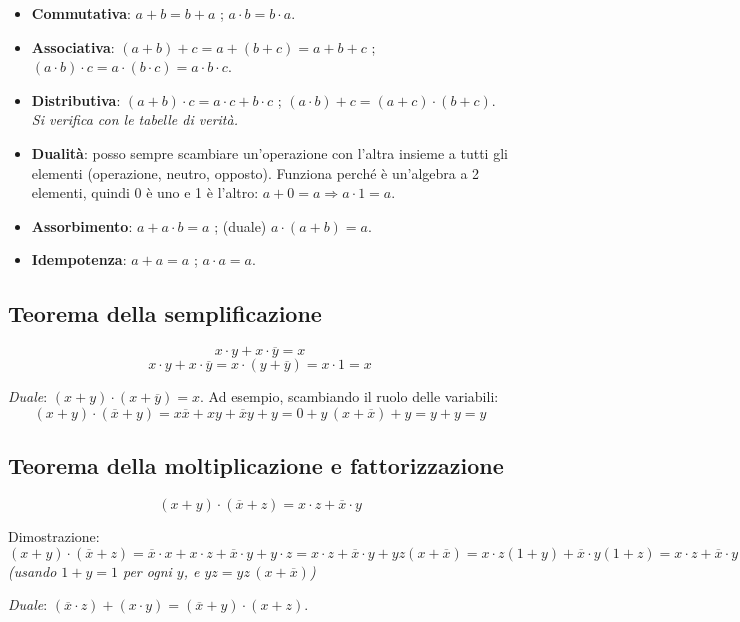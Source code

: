 \begin{itemize}[leftmargin=1.5em]
    \item \textbf{Commutativa}: $a+b=b+a$ \quad ; \quad $a\cdot b=b\cdot a$.
    \item \textbf{Associativa}: $(a+b)+c=a+(b+c)=a+b+c$ \quad ; \quad $(a\cdot b)\cdot c=a\cdot(b\cdot c)=a\cdot b\cdot c$.
    \item \textbf{Distributiva}: $(a+b)\cdot c=a\cdot c+b\cdot c$ \quad ; \quad $(a\cdot b)+c=(a+c)\cdot(b+c)$. \\
    \textit{Si verifica con le tabelle di verità.}
    \item \textbf{Dualità}: posso sempre scambiare un'operazione con l'altra insieme a tutti gli elementi (operazione, neutro, opposto). Funziona perché è un'algebra a 2 elementi, quindi 0 è uno e 1 è l'altro: $a+0=a \Rightarrow a\cdot 1=a$.
    \item \textbf{Assorbimento}: $a+a\cdot b=a$ \quad ; \quad (duale) $a\cdot(a+b)=a$.
    \item \textbf{Idempotenza}: $a+a=a$ \quad ; \quad $a\cdot a=a$.
\end{itemize}

\subsection{Teorema della semplificazione}

\[
x\cdot y + x\cdot\overline{y} = x
\]
\[
x\cdot y + x\cdot\overline{y} = x\cdot(y+\overline{y}) = x\cdot 1 = x
\]

\noindent\textit{Duale}: $(x+y)\cdot(x+\overline{y})=x$. Ad esempio, scambiando il ruolo delle variabili:
\[
(x+y)\cdot(\overline{x}+y)=x\overline{x}+xy+\overline{x}y+y=0+y\,(x+\overline{x})+y=y+y=y
\]

\subsection{Teorema della moltiplicazione e fattorizzazione}

\[
(x+y)\cdot(\overline{x}+z)=x\cdot z+\overline{x}\cdot y
\]

Dimostrazione:
\[
(x+y)\cdot(\overline{x}+z)=\overline{x}\cdot x+x\cdot z+\overline{x}\cdot y+y\cdot z
=x\cdot z+\overline{x}\cdot y+yz(x+\overline{x})
=x\cdot z(1+y)+\overline{x}\cdot y(1+z)=x\cdot z+\overline{x}\cdot y
\]
\textit{(usando $1+y=1$ per ogni $y$, e $yz=yz\,(x+\overline{x})$)}

\noindent\textit{Duale}: $(\overline{x}\cdot z)+(x\cdot y)=(\overline{x}+y)\cdot(x+z)$.

